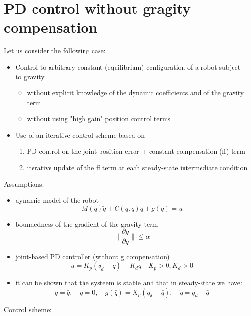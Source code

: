 \documentclass{book}
\begin{document}
\section{PD control without gragity compensation}
Let us consider the following case:
\begin{itemize}
    \item Control to arbitrary constant (equilibrium) configuration of a robot subject to gravity \begin{itemize}
            \item without explicit knowledge of the dynamic coefficients and of the gravity term
            \item without using "high gain" position control terms
        \end{itemize}
    \item Use of an iterative control scheme based on \begin{enumerate}
            \item PD control on the joint position error + constant compensation (ff) term 
            \item iterative update of the ff term at each steady-state intermediate condition
        \end{enumerate}
\end{itemize}
Assumptions: 
\begin{itemize}
    \item dynamic model of the robot \[
            M(q)\ddot{q}+C(q,\dot{q})\dot{q}+g(q)=u
        \]
    \item boundedness of the gradient of the gravity term \[
            \|\displaystyle\frac{\partial g}{\partial q}\| \leq \alpha
        \] 
    \item joint-based PD controller (without g compensation) \[
            u= K_p(q_d-q) -K_d\dot{q} \quad K_p>0,K_d> 0
        \]
    \item it can be shown that the systeem is stable and that in steady-state we have:\[
            q=\bar{q},\quad \dot{q}=0,\quad g(\bar{q})=K_p(q_d-\bar{q}),\quad \tilde{q}=q_d-\bar{q}
        \]
\end{itemize}
Control scheme:
\end{document}
